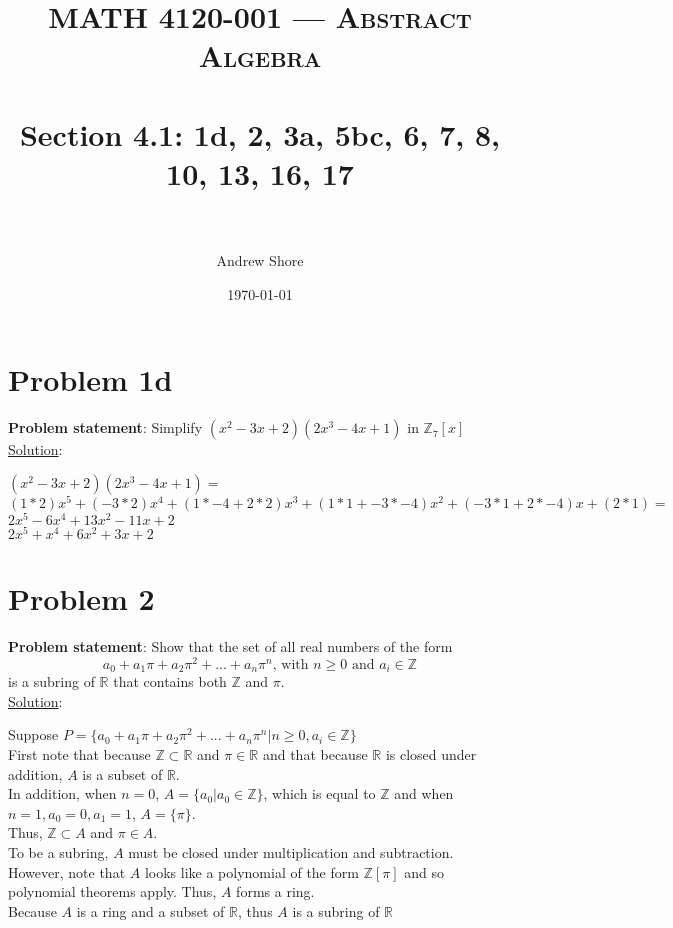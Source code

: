 \documentclass{article} %
\title{ 
\normalfont \normalsize 
\textsc{MATH 4120-001 --- Abstract Algebra} \\
\horrule{0.5pt} \\[0cm] %
\huge Section 4.1: 1d, 2, 3a, 5bc, 6, 7, 8, 10, 13, 16, 17 \\ %
\horrule{2pt} \\[0cm] %
}
\author{Andrew Shore} %
\date{\normalsize\today} %
\begin{document}
\maketitle %

\section*{Problem 1d}
\textbf{Problem statement}: Simplify $(x^2 -3x + 2)(2x^3 -4x + 1)$ in $\mathbb{Z}_7[x]$
\\

\underline{Solution}: 
\begin{addmargin}[1em]{0em}
$(x^2 - 3x + 2)(2x^3 - 4x + 1) = $
\\$(1 * 2)x^5 + (-3 * 2)x^4 + (1*-4 + 2*2)x^3 + (1*1 + -3 * -4)x^2 + (-3 * 1 + 2 * -4)x + (2 * 1) = $
\\$2x^5 - 6x^4 + 13x^2 - 11x + 2$
\\$2x^5 + x^4 + 6x^2 + 3x + 2$
\end{addmargin}
\newpage
\section*{Problem 2}
\textbf{Problem statement}: Show that the set of all real numbers of the form 
\[a_0 + a_1\pi + a_2\pi^2 + ... + a_n\pi^n \text{, with } n\geq 0 \text{ and } a_i \in \mathbb{Z}\]
is a subring of $\mathbb{R}$ that contains both $\mathbb{Z}$ and $\pi$.
\\

\underline{Solution}: 
\begin{addmargin}[1em]{0em}
Suppose $P = \{a_0 + a_1\pi + a_2\pi^2 + ... + a_n\pi^n | n \geq 0, a_i \in \mathbb{Z}\}$
\\First note that because $\mathbb{Z} \subset \mathbb{R}$ and $\pi \in \mathbb{R}$ and that because $\mathbb{R}$ is closed under addition, $A$ is a subset of $\mathbb{R}$.
\\In addition, when $n = 0$, $A = \{a_0 | a_0 \in \mathbb{Z} \}$, which is equal to $\mathbb{Z}$ and when $n = 1, a_0 = 0, a_1 = 1$, $A = \{\pi\}$.
\\Thus, $\mathbb{Z} \subset A$ and $\pi \in A$.
\\To be a subring, $A$ must be closed under multiplication and subtraction.
\\However, note that $A$ looks like a polynomial of the form $\mathbb{Z}[\pi]$ and so polynomial theorems apply.  Thus, $A$ forms a ring.
\\Because $A$ is a ring and a subset of $\mathbb{R}$, thus $A$ is a subring of $\mathbb{R}$

\end{addmargin}
\newpage
\end{document}
